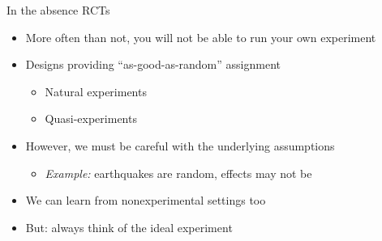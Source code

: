 \documentclass[aspectratio=169,compress,handout,t,xcolor=table]{beamer}
\begin{document}
\begin{frame}{In the absence RCTs}
  \begin{itemize}
    \item More often than not, you will not be able to run your own experiment
    \item Designs providing ``as-good-as-random'' assignment
    \begin{itemize}
      \item Natural experiments
      \item Quasi-experiments
    \end{itemize}
    \item However, we must be careful with the underlying assumptions
    \begin{itemize}
      \item \emph{Example:} earthquakes are random, effects may not be
    \end{itemize}
    \item We can learn from nonexperimental settings too
    \item But: always think of the ideal experiment
  \end{itemize}
\end{frame}
\end{document}
